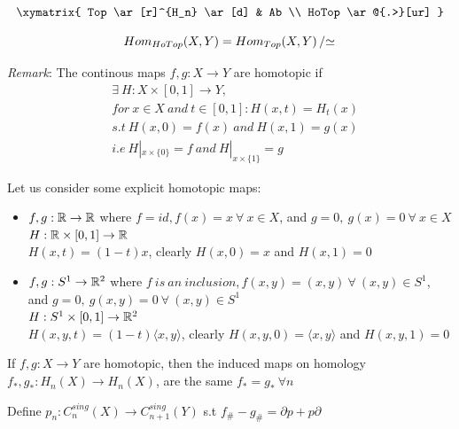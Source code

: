 \documentclass[11pt,a4paper]{report}
\begin{document}
	\[
		\xymatrix{
			Top  \ar[r]^{H_n} \ar[d]
			& Ab  \\
			HoTop \ar@{.>}[ur] }
	\]

	\[ {Hom}_{HoTop}(X, Y) = {Hom}_{Top}(X, Y) \left/ \simeq \right. \]

    \emph{Remark}: The continous maps $f, g: X \rightarrow Y$ are homotopic if
    \begin{align*}
     &\exists \ H: X \times [0, 1] \rightarrow Y , \\
     &for \ x \in X \ and \ t \in [0, 1]: H(x, t) = H_t(x) \\
     &s.t \ H(x, 0) = f(x) \ and \ H(x, 1) = g(x) \\
     &i.e \ H|_{x \times \{0\}} = f \ and \ H|_{x \times \{1\}} = g
     \end{align*}

     Let us consider some explicit homotopic maps:

     \begin{itemize}
      \item $f, g: \mathbb{R} \rightarrow \mathbb{R}$ where $f = id, f(x) = x \ \forall \ x \in X$, and $g = 0, \ g(x) = 0 \ \forall \ x \in X$ \\
      $H: \mathbb{R} \times [0, 1] \rightarrow \mathbb{R}$ \\
      $H(x, t) = (1-t)x$, clearly $H(x, 0) = x$ and $H(x, 1) = 0$
      \item $f, g: S^1 \rightarrow \mathbb{R}^2$ where $f \ is \ an \ inclusion, f(x,y) = (x,y) \ \forall \ (x, y) \in S^1$, and $g = 0, \ g(x,y) = 0 \ \forall \ (x, y) \in S^1$ \\
      $H: S^1 \times [0, 1] \rightarrow \mathbb{R}^2$ \\
      $H(x, y, t) = (1-t)\langle x, y \rangle$, clearly $H(x, y, 0) = \langle x, y \rangle$ and $H(x, y, 1) = 0$
     \end{itemize}

     \label{homotopicSpaces}If $f, g: X \rightarrow Y$ are homotopic, then the induced maps on homology
     $f_*, g_*: H_n(X) \rightarrow H_n(X)$, are the same $f_* = g_* \ \forall{n}$

     Define $p_n: C_n^{sing}(X) \rightarrow C_{n+1}^{sing}(Y) $ s.t $f_\# - g_\# = \partial p + p\partial$ \\
\end{document}
